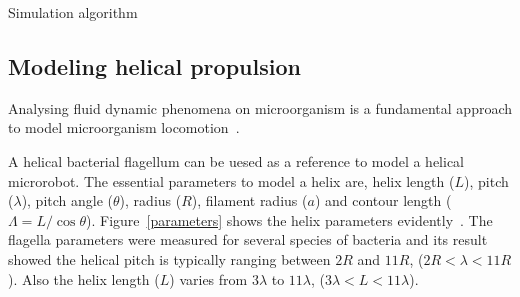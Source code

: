 \documentclass[12pt,a4paper,titlepage]{report}
\begin{document}
\begin{algorithm}[H]
 \caption[Simulation details]{Simulation algorithm}
\label{PSuedocode}
\end{algorithm}










\subsection{Modeling helical propulsion}\label{maths}

Analysing fluid dynamic phenomena on microorganism is a fundamental approach to model
 microorganism
 locomotion~\citep{smith2009boundary}.



A helical bacterial flagellum can be uesed as a reference to model a helical microrobot. The 
essential parameters to model a helix are, helix length ($L$), pitch ($\lambda$), pitch angle ($\theta$), 
radius ($R$), filament radius ($a$) and contour length ($\Lambda = L/ \cos \theta$). Figure~\ref{parameters} shows
the helix parameters evidently~\citep{rodenborn2013propulsion}. The flagella parameters were measured for
 several species of bacteria and its result showed the helical pitch is typically ranging between $2R$ and
$11R$, ($2R < \lambda < 11R$). Also the helix length ($L$) varies from $3\lambda$ to $11\lambda$, 
($3\lambda < L < 11\lambda$).
\end{document}
